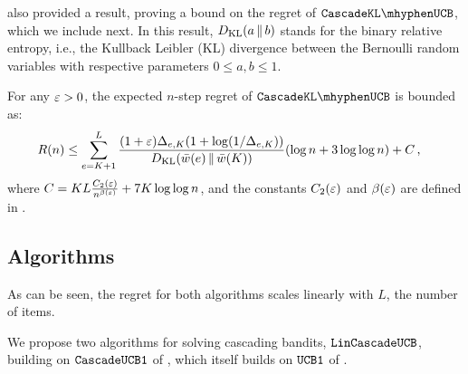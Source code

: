 \citet{kveton15cascade}  also provided a result, proving a bound on the regret of $\cascadeklucb$, which we include next.
In this result, $D_\mathrm{KL}(a \,\|\, b)$ stands for the binary relative entropy, i.e., the Kullback Leibler (KL) divergence between the Bernoulli random variables with respective parameters $0\le a,b\le 1$.
\begin{theorem}
\label{thm:klucb} For any $\varepsilon > 0$, the expected $n$-step regret of $\cascadeklucb$ is bounded as:
\begin{align*}
  R(n)
  & \leq \sum_{e = K + 1}^L
  \frac{(1 + \varepsilon) \Delta_{e, K} (1 + \log(1 / \Delta_{e, K}))}{D_\mathrm{KL}(\bar{w}(e) \,\|\, \bar{w}(K))} (\log n + 3 \log \log n) + C\,,
\end{align*}
where $C = K L \frac{C_2(\varepsilon)}{n^{\beta(\varepsilon)}} + 7 K \log \log n$, and the constants $C_2(\varepsilon)$ and $\beta(\varepsilon)$ are defined in \citet{garivier11klucb}.
\end{theorem}

\subsection{Algorithms}
\label{sec:algorithms}
As can be seen, the regret for both algorithms scales linearly with $L$, the number of items.

We propose two algorithms for solving cascading bandits, ${\tt LinCascadeUCB}$, building on ${\tt CascadeUCB1}$ of
  \citet{kveton15cascade}, which itself builds on ${\tt UCB1}$ of \cite{auer02finitetime}.

